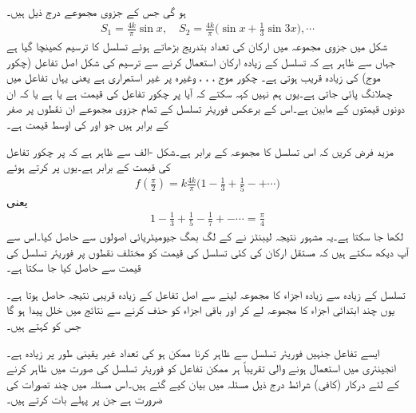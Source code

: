ہو گی جس کے جزوی مجموعے درج ذیل ہیں۔
\begin{align*}
S_1=\frac{4k}{\pi}\sin x,\quad S_2=\frac{4k}{\pi}\big(\sin x+\frac{1}{3}\sin 3x\big),\cdots
\end{align*}
شکل  میں جزوی مجموعہ میں ارکان کی تعداد بتدریج بڑھاتے ہوئے تسلسل کا ترسیم کھینچا  گیا ہے جہاں سے ظاہر ہے کہ تسلسل کے زیادہ ارکان استعمال کرنے سے  ترسیم کی شکل اصل تفاعل (چکور موج) کی زیادہ  قریب ہوتی ہے۔ چکور موج ، ، ، وغیرہ پر غیر استمراری ہے یعنی یہاں تفاعل میں چھلانگ پائی جاتی ہے۔یوں ہم نہیں کہہ سکتے کہ آیا  پر چکور تفاعل کی قیمت  ہے یا  ہے  یا کہ ان دونوں قیمتوں کے مابین ہے۔اس کے برعکس فوریئر تسلسل کے تمام جزوی مجموعے ان نقطوں پر صفر کے برابر ہیں جو  اور  کی اوسط قیمت ہے۔

مزید فرض کریں کہ اس تسلسل کا مجموعہ  کے برابر ہے۔شکل -الف سے ظاہر ہے کہ  پر چکور تفاعل کی قیمت  کے برابر ہے۔یوں  پر  کرتے ہوئے
\begin{align*}
f(\frac{\pi}{2})=k\frac{4k}{\pi}\big(1-\frac{1}{3}+\frac{1}{5}-+\cdots\big )
\end{align*}
یعنی
\begin{align}\label{مساوات_فوریئر_لیبنٹز_تعلق}
1-\frac{1}{3}+\frac{1}{5}-\frac{1}{7}+-\cdots=\frac{\pi}{4}
\end{align}
لکھا جا سکتا ہے۔یہ مشہور نتیجہ لیبنٹز نے  کے لگ بھگ جیومیٹریائی اصولوں سے حاصل کیا۔اس سے آپ دیکھ سکتے ہیں کہ مستقل ارکان کی کئی تسلسل کی قیمت کو  مختلف نقطوں پر فوریئر تسلسل کی قیمت سے حاصل کیا جا سکتا ہے۔  

تسلسل کے  زیادہ  سے زیادہ اجزاء کا مجموعہ لینے سے اصل تفاعل کے زیادہ قریبی نتیجہ حاصل ہوتا ہے۔یوں چند ابتدائی اجزاء کا مجموعہ لے کر اور باقی اجزاء کو حذف کرنے سے نتائج میں خلل پیدا ہو گا جس کو  کہتے ہیں۔



ایسے تفاعل جنہیں فوریئر تسلسل سے  ظاہر کرنا ممکن ہو کی تعداد غیر یقینی طور پر زیادہ ہے۔ انجینئری میں استعمال ہونے  والی تقریباً ہر ممکن تفاعل کو فوریئر تسلسل کی صورت میں ظاہر کرنے کے لئے درکار (کافی) شرائط درج ذیل مسئلہ  میں بیان کیے گئے ہیں۔اس مسئلہ میں چند تصورات کی ضرورت ہے جن پر پہلے بات کرتے ہیں۔

